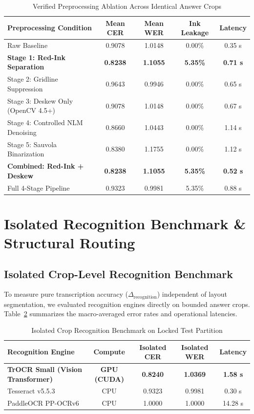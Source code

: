 \documentclass[journal]{IEEEtran}
\begin{document}
\begin{table}[htbp]
\centering
\caption{Verified Preprocessing Ablation Across Identical Answer Crops}
\label{tab:preprocessing_ablation}
\begin{tabular}{lcccc}
\toprule
\textbf{Preprocessing Condition} & \textbf{Mean CER} & \textbf{Mean WER} & \textbf{Ink Leakage} & \textbf{Latency} \\
\midrule
Raw Baseline & 0.9078 & 1.0148 & 0.00\% & 0.35 s \\
\textbf{Stage 1: Red-Ink Separation} & \textbf{0.8238} & \textbf{1.1055} & \textbf{5.35\%} & \textbf{0.71 s} \\
Stage 2: Gridline Suppression & 0.9643 & 0.9946 & 0.00\% & 0.65 s \\
Stage 3: Deskew Only (OpenCV 4.5+) & 0.9078 & 1.0148 & 0.00\% & 0.67 s \\
Stage 4: Controlled NLM Denoising & 0.8660 & 1.0443 & 0.00\% & 1.14 s \\
Stage 5: Sauvola Binarization & 0.8380 & 1.1755 & 0.00\% & 1.12 s \\
\textbf{Combined: Red-Ink + Deskew} & \textbf{0.8238} & \textbf{1.1055} & \textbf{5.35\%} & \textbf{0.52 s} \\
Full 4-Stage Pipeline & 0.9323 & 0.9981 & 5.35\% & 0.88 s \\
\bottomrule
\end{tabular}
\end{table}

\section{Isolated Recognition Benchmark \& Structural Routing}
\subsection{Isolated Crop-Level Recognition Benchmark}
To measure pure transcription accuracy ($\Delta_{\text{recognition}}$) independent of layout segmentation, we evaluated recognition engines directly on bounded answer crops. Table~\ref{tab:recognition_summary} summarizes the macro-averaged error rates and operational latencies.

\begin{table}[htbp]
\centering
\caption{Isolated Crop Recognition Benchmark on Locked Test Partition}
\label{tab:recognition_summary}
\begin{tabular}{lcccc}
\toprule
\textbf{Recognition Engine} & \textbf{Compute} & \textbf{Isolated CER} & \textbf{Isolated WER} & \textbf{Latency} \\
\midrule
\textbf{TrOCR Small (Vision Transformer)} & \textbf{GPU (CUDA)} & \textbf{0.8240} & \textbf{1.0369} & \textbf{1.58 s} \\
Tesseract v5.5.3 & CPU & 0.9323 & 0.9981 & 0.30 s \\
PaddleOCR PP-OCRv6 & CPU & 1.0000 & 1.0000 & 14.28 s \\
\bottomrule
\end{tabular}
\end{table}
\end{document}
